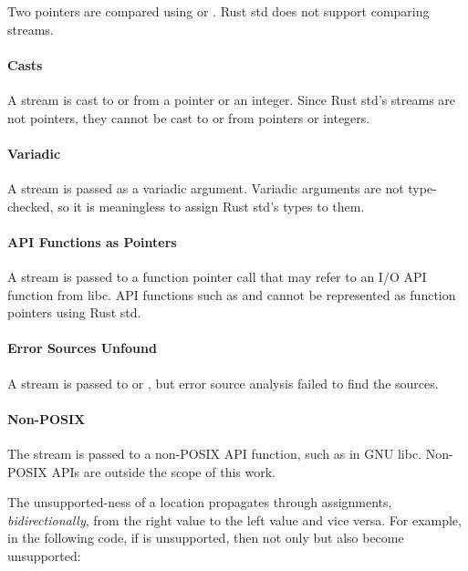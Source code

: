 Two  pointers are compared using \CT{==} or \CT{!=}.
%
Rust std does not support comparing streams.

\paragraph{Casts}

A stream is cast to or from a  pointer or an integer.
%
Since Rust std's streams are not pointers, they cannot be cast to or from
 pointers or integers.

\paragraph{Variadic}

A stream is passed as a variadic argument.
%
Variadic arguments are not type-checked, so it is meaningless to assign Rust
std's types to them.

\paragraph{API Functions as Pointers}

A stream is passed to a function pointer call that may refer to an I/O API
function from libc.
%
API functions such as  and  cannot be represented as function
pointers using Rust std.

\paragraph{Error Sources Unfound}

A stream is passed to  or , but error source analysis failed
to find the sources.

\paragraph{Non-POSIX}

The stream is passed to a non-POSIX API function, such as  in
GNU libc.
%
Non-POSIX APIs are outside the scope of this work.

\vspace{0.5em}

The unsupported-ness of a location propagates through assignments,
\emph{bidirectionally}, from the right value to the left value and vice versa.
%
For example, in the following code, if  is unsupported, then not only 
but also  become unsupported:


